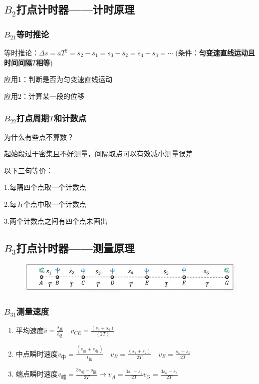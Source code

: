 \documentclass[lang=cn,10pt]{elegantbook}
\begin{document}
	\subsection{$B_{2}$打点计时器——计时原理}
	\subsubsection{$B_{21}$等时推论}
	等时推论：$\Delta s=aT^{2}=s_{2}-s_{1}=s_{3}-s_{2}=s_{4}-s_{3}=\cdots $
	(条件：\textbf{匀变速直线运动且时间间隔$T$相等})
	\begin{note}
		应用1：判断是否为匀变速直线运动
		
		\vspace{0.3cm}
		应用2：计算某一段的位移
	\end{note}
	\subsubsection{$B_{22}$打点周期$T$和计数点}
	为什么有些点不算数？
	
	起始段过于密集且不好测量，间隔取点可以有效减小测量误差
	
	\begin{remark}
		以下三句等价：
		
		1.每隔四个点取一个计数点
		
		2.每五个点中取一个计数点
		
		3.两个计数点之间有四个点未画出
	\end{remark}
	\vspace{-0.5cm}
	\subsection{$B_{3}$打点计时器——测量原理}
	\vspace{-0.5cm}
	\begin{figure}[H]
		\centering
		\includegraphics[width=0.8\linewidth]{image/2}
	\end{figure}
	\vspace{-0.5cm}
	\subsubsection{$B_{31}$测量速度}
	\begin{enumerate}
		\item $\text{平均速度}\bar{v}=\frac{s_{总}}{t_{总}}\quad v_{CE}=\frac{(s_{3}+s_{4})}{(2T)} $
		\item $\text{中点瞬时速度}v_{\text{中}}=\frac{(s_{\text{左}}+s_{\text{右}})}{t_{\text{总}}}\quad v_{B}=\frac{(s_{1}+s_{2})}{2T}\quad v_{E}=\frac{s_{4}+s_{5}}{2T}$
		\item $\text{端点瞬时速度}v_{\text{端}}=\frac{3s_{\text{邻}}-s_{\text{隔}}}{2T}\to v_{A}=\frac{3s_{1}-s_{2}}{2T}v_{G}=\frac{3s_{6}-s_{5}}{2T}$
	\end{enumerate}
\end{document}
